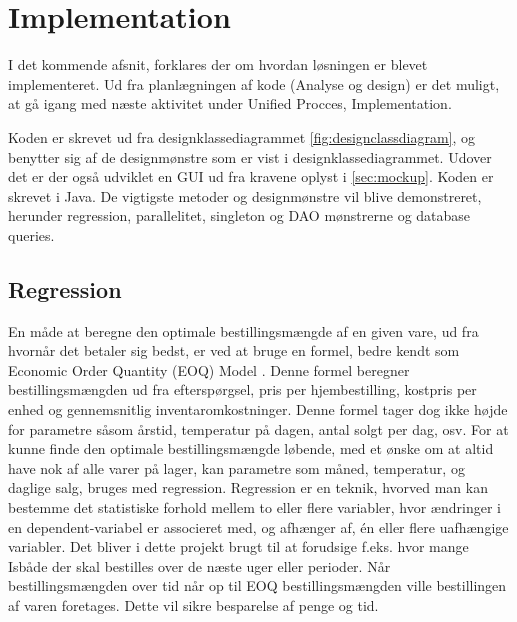 \chapter{Implementation}\label{ch:implementation}
I det kommende afsnit, forklares der om hvordan løsningen er blevet implementeret. Ud fra planlægningen af kode (Analyse og design) er det muligt, at gå igang med næste aktivitet under Unified Procces, Implementation\cite{UnifiedProcess}. 

Koden er skrevet ud fra designklassediagrammet \ref{fig:designclassdiagram}, og benytter sig af de designmønstre som er vist i designklassediagrammet. Udover det er der også udviklet en GUI ud fra kravene oplyst i \ref{sec:mockup}. Koden er skrevet i Java. 
De vigtigste metoder og designmønstre vil blive demonstreret, herunder regression, parallelitet, singleton og DAO mønstrerne og database queries.

\section{Regression}
En måde at beregne den optimale bestillingsmængde af en given vare, ud fra hvornår det betaler sig bedst, er ved at bruge en formel, bedre kendt som Economic Order Quantity (EOQ) Model \cite{EOQ}. Denne formel beregner bestillingsmængden ud fra efterspørgsel, pris per hjembestilling, kostpris per enhed og gennemsnitlig inventaromkostninger. Denne formel tager dog ikke højde for parametre såsom årstid, temperatur på dagen, antal solgt per dag, osv. For at kunne finde den optimale bestillingsmængde løbende, med et ønske om at altid have nok af alle varer på lager, kan parametre som måned, temperatur, og daglige salg, bruges med regression. Regression er en teknik, hvorved man kan bestemme det statistiske forhold mellem to eller flere variabler, hvor ændringer i en dependent-variabel er associeret med, og afhænger af, én eller flere uafhængige variabler\cite{RegDef}. Det bliver i dette projekt brugt til at forudsige f.eks. hvor mange Isbåde\cite{Isbåd} der skal bestilles over de næste uger eller perioder. Når bestillingsmængden over tid når op til EOQ bestillingsmængden ville bestillingen af varen foretages. Dette vil sikre besparelse af penge og tid.


